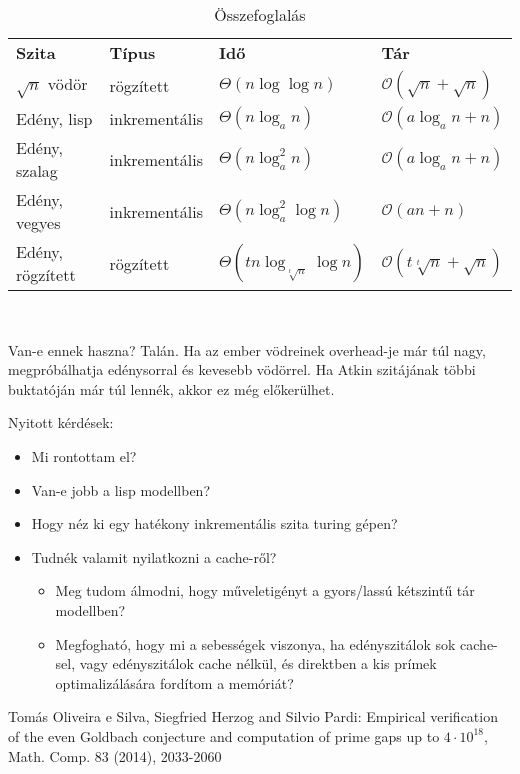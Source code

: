 \documentclass{article}
\begin{document}
\begin{table}[H]
\renewcommand\arraystretch{1.4}
\centering
\caption{Összefoglalás}
\begin{tabular}{|l|l|l|l|}
\hline
\bf{Szita} & \bf{Típus} & \bf{Idő} & \bf{Tár} \\ \cline{1-4}

$\sqrt{n}$ vödör & rögzített & $\Theta(n \log{\log{n}})$ & $\mathcal{O}(\sqrt{n}+\sqrt{n})$ \\ \cline{1-4}
Edény, lisp & inkrementális & $\Theta(n \log_{a}{n})$ & $\mathcal{O}(a \log_{a}{n} + n)$ \\\cline{1-4}
Edény, szalag & inkrementális & $\Theta(n \log_{a}^2{n})$ & $\mathcal{O}(a \log_{a}{n} + n)$ \\ \cline{1-4}
Edény, vegyes & inkrementális & $\Theta(n \log_{a}^2{\log{n}})$ & $\mathcal{O}(an + n)$ \\ \cline{1-4}
Edény, rögzített & rögzített & $\Theta(t n \log_{\sqrt[t]{n}}{\log{n}})$ & $\mathcal{O}(t \sqrt[t]{n}+\sqrt{n})$ \\ \cline{1-4}

\hline
\end{tabular}
\end{table}
\

Van-e ennek haszna? Talán. Ha az ember vödreinek overhead-je már túl nagy, megpróbálhatja edénysorral és kevesebb vödörrel. Ha Atkin szitájának többi buktatóján már túl lennék, akkor ez még előkerülhet.

Nyitott kérdések:
\begin{itemize}
\item Mi rontottam el?
\item Van-e jobb a lisp modellben?
\item Hogy néz ki egy hatékony inkrementális szita turing gépen?
\item Tudnék valamit nyilatkozni a cache-ről?
\begin{itemize}
\item Meg tudom álmodni, hogy műveletigényt a gyors/lassú kétszintű tár modellben?
\item Megfogható, hogy mi a sebességek viszonya, ha edényszitálok sok cache-sel, vagy edényszitálok cache nélkül, és direktben a kis prímek optimalizálására fordítom a memóriát?
\end{itemize}
\end{itemize}

\begin{thebibliography}{9}

Tomás Oliveira e Silva, Siegfried Herzog and Silvio Pardi: Empirical verification of the even Goldbach conjecture and computation of prime gaps up to $4\cdot10^{18}$, Math. Comp. 83 (2014), 2033-2060

\end{thebibliography}
\end{document}
